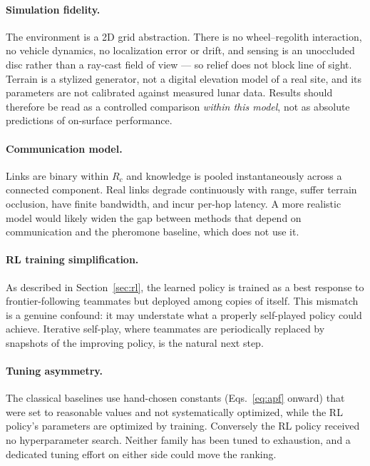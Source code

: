 \documentclass[11pt]{article}
\begin{document}
\paragraph{Simulation fidelity.}
The environment is a 2D grid abstraction. There is no wheel--regolith
interaction, no vehicle dynamics, no localization error or drift, and sensing is
an unoccluded disc rather than a ray-cast field of view --- so relief does not
block line of sight. Terrain is a stylized generator, not a digital elevation
model of a real site, and its parameters are not calibrated against measured
lunar data. Results should therefore be read as a controlled comparison
\emph{within this model}, not as absolute predictions of on-surface performance.

\paragraph{Communication model.}
Links are binary within $R_c$ and knowledge is pooled instantaneously across a
connected component. Real links degrade continuously with range, suffer
terrain occlusion, have finite bandwidth, and incur per-hop latency. A more
realistic model would likely widen the gap between methods that depend on
communication and the pheromone baseline, which does not use it.

\paragraph{RL training simplification.}
As described in Section~\ref{sec:rl}, the learned policy is trained as a best
response to frontier-following teammates but deployed among copies of itself.
This mismatch is a genuine confound: it may understate what a
properly self-played policy could achieve. Iterative self-play, where teammates
are periodically replaced by snapshots of the improving policy, is the natural
next step.

\paragraph{Tuning asymmetry.}
The classical baselines use hand-chosen constants
(Eqs.~\eqref{eq:apf} onward) that were set to reasonable values and not
systematically optimized, while the RL policy's parameters are optimized by
training. Conversely the RL policy received no hyperparameter search. Neither
family has been tuned to exhaustion, and a dedicated tuning effort on either
side could move the ranking.
\end{document}
